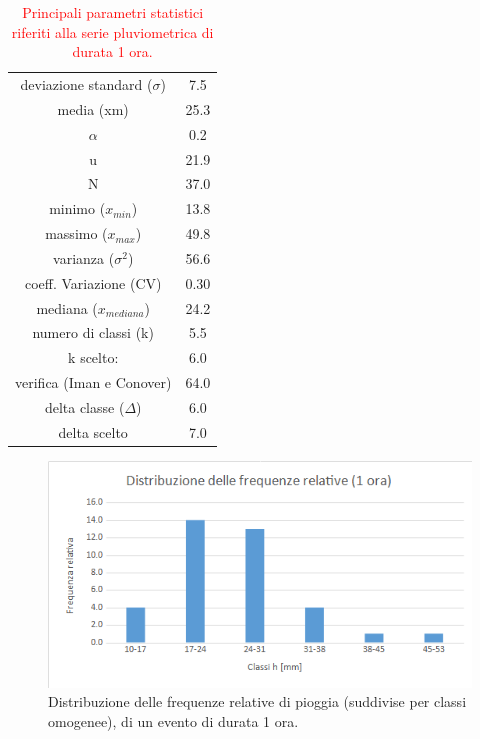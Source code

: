 \begin{table}[H] \centering
    \caption{\textcolor{red}{Principali parametri statistici riferiti alla serie pluviometrica di durata 1 ora.}}
        \begin{tabular}{cc}
    \toprule
        deviazione standard ($\sigma$)   & 7.5  \\
        media (xm)                & 25.3 \\
        $\alpha$                & 0.2  \\
        u                & 21.9 \\
        N                & 37.0 \\
        minimo ($x_{min}$)             & 13.8 \\
        massimo ($x_{max}$)            & 49.8 \\
        varianza ($\sigma ^2$)             & 56.6 \\
        coeff. Variazione (CV)    & 0.30 \\
        mediana ($x_{mediana}$)        & 24.2 \\
        numero di classi (k)      & 5.5  \\
        k scelto:                 & 6.0  \\
        verifica (Iman e Conover) & 64.0 \\
        delta classe ($\Delta$)          & 6.0  \\
        delta scelto             & 7.0 \\
        \bottomrule 
 \end{tabular}
\end{table}



\begin{figure}[H]\centering
    \includegraphics[scale=.6]{immagini/freq_piogg_rel_1ora.png}
    \caption{Distribuzione delle frequenze relative di pioggia (suddivise per classi omogenee), di un evento di durata 1 ora.}
  \label{freq_rel_piogg_05ore}
\end{figure}


